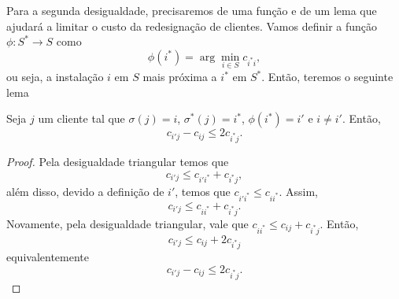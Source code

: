 Para a segunda desigualdade, precisaremos de uma função e de um lema que ajudará a limitar o custo da redesignação de clientes. 
Vamos definir a função $\phi : S^* \rightarrow S$ como \[\phi(i^*) = \arg\min_{i \in S} c_{i^*i},\] ou seja, a instalação $i$ em $S$ mais próxima a $i^*$ em $S^*$. Então, teremos o seguinte lema
\begin{lemma}
    \label{lemma:3.8}
    Seja $j$ um cliente tal que $\sigma(j) = i$, $\sigma^*(j) = i^*$, $\phi(i^*) = i'$ e $i\neq i'.$ Então, \[c_{i'j} - c_{ij} \leq 2c_{i^*j}.\]
\end{lemma}

\begin{proof}
    Pela desigualdade triangular temos que
    \[c_{i'j} \leq c_{i'i^*} + c_{i^*j},\] além disso, devido a definição de $i'$, temos que $c_{i'i^*} \leq c_{ii^*}$. Assim,
    \[c_{i'j} \leq c_{ii^*} + c_{i^*j}.\]
    Novamente, pela desigualdade triangular, vale que $c_{ii^*} \leq c_{ij} + c_{i^*j}$. Então,
    \[
        c_{i'j} \leq c_{ij} + 2 c_{i^*j} 
    \] equivalentemente \[
        c_{i'j} - c_{ij} \leq 2 c_{i^*j}. \]
\end{proof}

